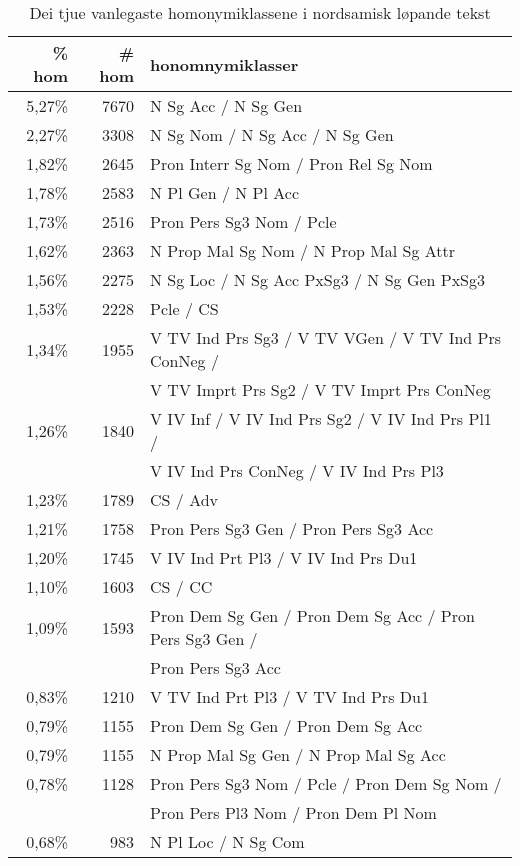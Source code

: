 \documentclass[a4paper,nynorsk]{article}
\begin{document}
\begin{table}[htdp]
\caption{Dei tjue vanlegaste homonymiklassene i nordsamisk løpande tekst}
\begin{center}
\begin{tabular}{|r|r|l|}
\hline
\% hom & \# hom & honomnymiklasser \\
\hline
5,27\% & 7670 & N Sg Acc /  N Sg Gen \\
2,27\% & 3308 & N Sg Nom /  N Sg Acc /  N Sg Gen \\
1,82\% & 2645 & Pron Interr Sg Nom /  Pron Rel Sg Nom \\
1,78\% & 2583 & N Pl Gen /  N Pl Acc \\
1,73\% & 2516 & Pron Pers Sg3 Nom /  Pcle \\
1,62\% & 2363 & N Prop Mal Sg Nom /  N Prop Mal Sg Attr \\
1,56\% & 2275 & N Sg Loc /  N Sg Acc PxSg3 /  N Sg Gen PxSg3 \\
1,53\% & 2228 & Pcle /  CS \\
1,34\% & 1955 & V TV Ind Prs Sg3 /  V TV VGen /  V TV Ind Prs ConNeg /  \\  
       &      & V TV Imprt Prs Sg2 /  V TV Imprt Prs ConNeg \\
1,26\% & 1840 & V IV Inf /  V IV Ind Prs Sg2 /  V IV Ind Prs Pl1 / \\
       &      & V IV Ind Prs ConNeg /  V IV Ind Prs Pl3 \\
1,23\% & 1789 & CS /  Adv \\
1,21\% & 1758 & Pron Pers Sg3 Gen /  Pron Pers Sg3 Acc \\
1,20\% & 1745 & V IV Ind Prt Pl3 /  V IV Ind Prs Du1 \\
1,10\% & 1603 & CS /  CC \\
1,09\% & 1593 & Pron Dem Sg Gen /  Pron Dem Sg Acc /  Pron Pers Sg3 Gen / \\
       &      & Pron Pers Sg3 Acc \\
0,83\% & 1210 & V TV Ind Prt Pl3 /  V TV Ind Prs Du1 \\
0,79\% & 1155 & Pron Dem Sg Gen /  Pron Dem Sg Acc \\
0,79\% & 1155 & N Prop Mal Sg Gen /  N Prop Mal Sg Acc \\
0,78\% & 1128 & Pron Pers Sg3 Nom /  Pcle /  Pron Dem Sg Nom / \\
       &      & Pron Pers Pl3 Nom /  Pron Dem Pl Nom \\
0,68\% &  983 & N Pl Loc /  N Sg Com \\
\hline
\end{tabular}
\end{center}
\label{smehom}
\end{table}%
\end{document}
